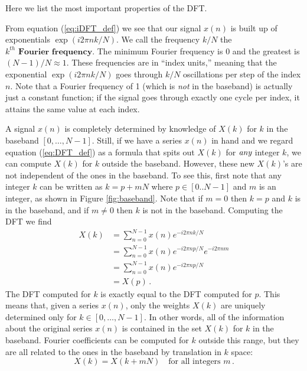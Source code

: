 
Here we list the most important properties of the DFT.


From equation (\ref{eq:iDFT_def}) we see that our signal $x(n)$ is built up of exponentials $\exp(i2\pi nk/N)$.
We call the frequency $k/N$ the $k^{th}\textbf{ Fourier frequency}$.
The minimum Fourier frequency is 0 and the greatest is $(N-1)/N\approx1$.
These frequencies are in ``index units,'' meaning that the exponential $\exp(i 2 \pi n k / N)$ goes through $k/N$ oscillations per step of the index $n$.
Note that a Fourier frequency of 1 (which is \emph{not} in the baseband) is actually just a constant function; if the signal goes through exactly one cycle per index, it attains the same value at each index.



A signal $x(n)$ is completely determined by knowledge of $X(k)$ for $k$ in the baseband $[0,\ldots,N-1]$.
Still, if we have a series $x(n)$ in hand and we regard equation (\ref{eq:DFT_def}) as a formula that spits out $X(k)$ for $\emph{any}$ integer $k$, we can compute $X(k)$ for $k$ outside the baseband.
However, these new $X(k)$'s are not independent of the ones in the baseband.
To see this, first note that any integer $k$ can be written as $k=p+mN$ where $p \in [0..N-1]$ and $m$ is an integer, as shown in Figure \ref{fig:baseband}.
Note that if $m=0$ then $k=p$ and $k$ is in the baseband, and if $m \neq 0$ then $k$ is not in the baseband.
Computing the DFT we find
\begin{align}
X(k) &= \sum_{n=0}^{N-1} x(n) e^{-i2\pi nk/N}\\
&= \sum_{n=0}^{N-1} x(n) e^{-i2\pi np/N} e^{-i2\pi nm} \\
&= \sum_{n=0}^{N-1} x(n)e^{-i2\pi np/N} \\
&= X(p) \, .
\end{align}
The DFT computed for $k$ is exactly equal to the DFT computed for $p$.
This means that, given a series $x(n)$, only the weights $X(k)$ are uniquely determined only for $k \in [0, \ldots , N-1]$.
In other words, all of the information about the original series $x(n)$ is contained in the set $X(k)$ for $k$ in the baseband.
Fourier coefficients can be computed for $k$ outside this range, but they are all related to the ones in the baseband by translation in $k$ space:
\begin{equation}
X(k) = X(k+mN) \quad \textrm{for all integers }m \, . \label{eq:translational_symmetry}
\end{equation}

